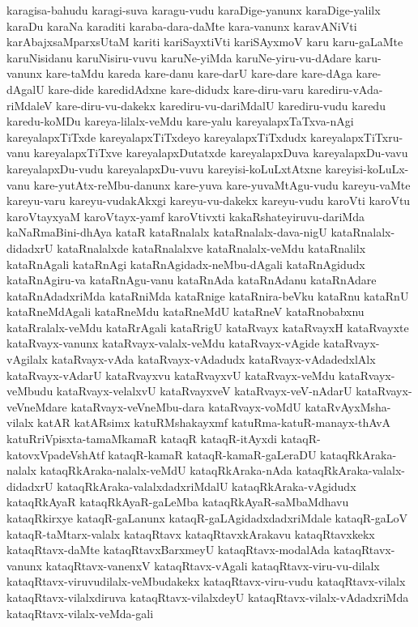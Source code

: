 {karagisa-bahudu
karagi-suva
karagu-vudu
karaDige-yanunx
karaDige-yalilx
karaDu
karaNa
karaditi
karaba-dara-daMte
kara-vanunx
karavANiVti
karAbajxsaMparxsUtaM
kariti
kariSayxtiVti
kariSAyxmoV
karu
karu-gaLaMte
karuNisidanu
karuNisiru-vuvu
karuNe-yiMda
karuNe-yiru-vu-dAdare
karu-vanunx
kare-taMdu
kareda
kare-danu
kare-darU
kare-dare
kare-dAga
kare-dAgalU
kare-dide
karedidAdxne
kare-didudx
kare-diru-varu
karediru-vAda-riMdaleV
kare-diru-vu-dakekx
karediru-vu-dariMdalU
karediru-vudu
karedu
karedu-koMDu
kareya-lilalx-veMdu
kare-yalu
kareyalapxTaTxva-nAgi
kareyalapxTiTxde
kareyalapxTiTxdeyo
kareyalapxTiTxdudx
kareyalapxTiTxru-vanu
kareyalapxTiTxve
kareyalapxDutatxde
kareyalapxDuva
kareyalapxDu-vavu
kareyalapxDu-vudu
kareyalapxDu-vuvu
kareyisi-koLuLxtAtxne
kareyisi-koLuLx-vanu
kare-yutAtx-reMbu-danunx
kare-yuva
kare-yuvaMtAgu-vudu
kareyu-vaMte
kareyu-varu
kareyu-vudakAkxgi
kareyu-vu-dakekx
kareyu-vudu
karoVti
karoVtu
karoVtayxyaM
karoVtayx-yamf
karoVtivxti
kakaRshateyiruvu-dariMda
kaNaRmaBini-dhAya
kataR
kataRnalalx
kataRnalalx-dava-nigU
kataRnalalx-didadxrU
kataRnalalxde
kataRnalalxve
kataRnalalx-veMdu
kataRnalilx
kataRnAgali
kataRnAgi
kataRnAgidadx-neMbu-dAgali
kataRnAgidudx
kataRnAgiru-va
kataRnAgu-vanu
kataRnAda
kataRnAdanu
kataRnAdare
kataRnAdadxriMda
kataRniMda
kataRnige
kataRnira-beVku
kataRnu
kataRnU
kataRneMdAgali
kataRneMdu
kataRneMdU
kataRneV
kataRnobabxnu
kataRralalx-veMdu
kataRrAgali
kataRrigU
kataRvayx
kataRvayxH
kataRvayxte
kataRvayx-vanunx
kataRvayx-valalx-veMdu
kataRvayx-vAgide
kataRvayx-vAgilalx
kataRvayx-vAda
kataRvayx-vAdadudx
kataRvayx-vAdadedxlAlx
kataRvayx-vAdarU
kataRvayxvu
kataRvayxvU
kataRvayx-veMdu
kataRvayx-veMbudu
kataRvayx-velalxvU
kataRvayxveV
kataRvayx-veV-nAdarU
kataRvayx-veVneMdare
kataRvayx-veVneMbu-dara
kataRvayx-voMdU
kataRvAyxMsha-vilalx
katAR
katARsimx
katuRMshakayxmf
katuRma-katuR-manayx-thAvA
katuRriVpisxta-tamaMkamaR
kataqR
kataqR-itAyxdi
kataqR-katovxVpadeVshAtf
kataqR-kamaR
kataqR-kamaR-gaLeraDU
kataqRkAraka-nalalx
kataqRkAraka-nalalx-veMdU
kataqRkAraka-nAda
kataqRkAraka-valalx-didadxrU
kataqRkAraka-valalxdadxriMdalU
kataqRkAraka-vAgidudx
kataqRkAyaR
kataqRkAyaR-gaLeMba
kataqRkAyaR-saMbaMdhavu
kataqRkirxye
kataqR-gaLanunx
kataqR-gaLAgidadxdadxriMdale
kataqR-gaLoV
kataqR-taMtarx-valalx
kataqRtavx
kataqRtavxkArakavu
kataqRtavxkekx
kataqRtavx-daMte
kataqRtavxBarxmeyU
kataqRtavx-modalAda
kataqRtavx-vanunx
kataqRtavx-vanenxV
kataqRtavx-vAgali
kataqRtavx-viru-vu-dilalx
kataqRtavx-viruvudilalx-veMbudakekx
kataqRtavx-viru-vudu
kataqRtavx-vilalx
kataqRtavx-vilalxdiruva
kataqRtavx-vilalxdeyU
kataqRtavx-vilalx-vAdadxriMda
kataqRtavx-vilalx-veMda-gali
}
